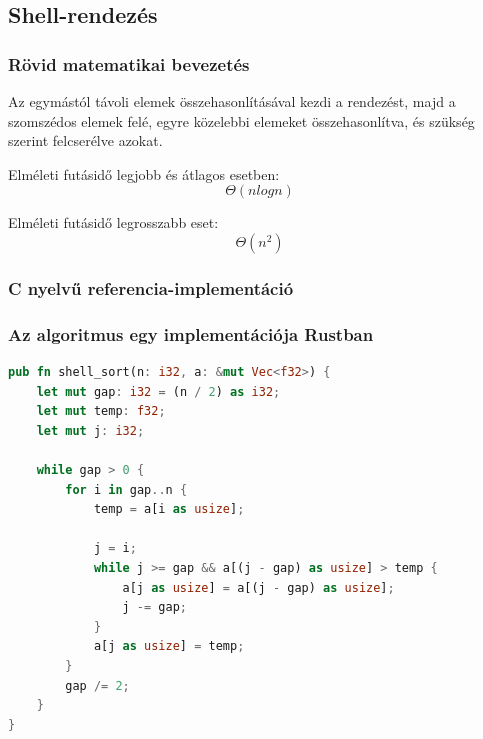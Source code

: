 \subsection{Shell-rendezés}
\subsubsection{Rövid matematikai bevezetés}
Az egymástól távoli elemek összehasonlításával kezdi a rendezést, majd a szomszédos elemek felé, egyre közelebbi elemeket összehasonlítva, és szükség szerint felcserélve azokat. 

\noindent Elméleti futásidő legjobb és átlagos esetben:
\[\Theta(n log n) \]

\noindent Elméleti futásidő legrosszabb eset:
\[\Theta(n^2)\]

\subsubsection{C nyelvű referencia-implementáció}

\subsubsection{Az algoritmus egy implementációja Rustban}
\begin{lstlisting}[language=Rust]
pub fn shell_sort(n: i32, a: &mut Vec<f32>) {
    let mut gap: i32 = (n / 2) as i32;
    let mut temp: f32;
    let mut j: i32;

    while gap > 0 {
        for i in gap..n {
            temp = a[i as usize];

            j = i;
            while j >= gap && a[(j - gap) as usize] > temp {
                a[j as usize] = a[(j - gap) as usize];
                j -= gap;
            }
            a[j as usize] = temp;
        }
        gap /= 2;
    }
}
\end{lstlisting}
